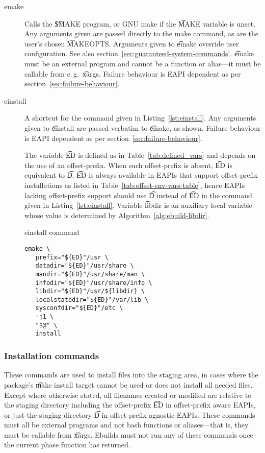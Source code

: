\begin{description}
\item[emake] Calls the \t{\$MAKE} program, or GNU make if the \t{MAKE} variable is unset.
    Any arguments given are passed directly to the make command, as are the user's chosen
    \t{MAKEOPTS}\@. Arguments given to \t{emake} override user configuration. See also
    section~\ref{sec:guaranteed-system-commands}. \t{emake} must be an external program and cannot
    be a function or alias---it must be callable from e.\,g.\ \t{xargs}. Failure behaviour is EAPI
    dependent as per section~\ref{sec:failure-behaviour}.
\item[einstall] A shortcut for the command given in Listing~\ref{lst:einstall}. Any arguments given
    to \t{einstall} are passed verbatim to \t{emake}, as shown. Failure behaviour is EAPI dependent
    as per section~\ref{sec:failure-behaviour}.

    The variable \t{ED} is defined as in Table~\ref{tab:defined_vars} and depends on the use of an
    offset-prefix. When such offset-prefix is absent, \t{ED} is equivalent to \t{D}. \t{ED} is always
    available in EAPIs that support offset-prefix installations as listed in
    Table~\ref{tab:offset-env-vars-table}, hence EAPIs lacking offset-prefix support should use \t{D}
    instead of \t{ED} in the command given in Listing~\ref{lst:einstall}.
    Variable \t{libdir} is an auxiliary local variable whose value is determined by
    Algorithm~\ref{alg:ebuild-libdir}.
\begin{listing}[H]
  \caption{einstall command}\label{lst:einstall}
  \begin{verbatim}
emake \
   prefix="${ED}"/usr \
   datadir="${ED}"/usr/share \
   mandir="${ED}"/usr/share/man \
   infodir="${ED}"/usr/share/info \
   libdir="${ED}"/usr/${libdir} \
   localstatedir="${ED}"/var/lib \
   sysconfdir="${ED}"/etc \
   -j1 \
   "$@" \
   install
  \end{verbatim}
\end{listing}

\end{description}

\subsubsection{Installation commands}
These commands are used to install files into the staging area, in cases where the package's \t{make
install} target cannot be used or does not install all needed files. Except where otherwise stated,
all filenames created or modified are relative to the staging directory including the offset-prefix
\t{ED} in offset-prefix aware EAPIs, or just the staging directory \t{D} in offset-prefix agnostic
EAPIs. These commands must all be external programs and not bash functions or aliases---that is, they
must be callable from \t{xargs}. Ebuilds must not run any of these commands once the current phase
function has returned.


